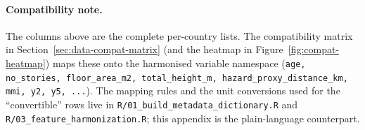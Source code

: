 \documentclass[11pt,a4paper]{article}
\begin{document}
\paragraph{Compatibility note.} The columns above are the complete
per-country lists. The compatibility matrix in
Section~\ref{sec:data-compat-matrix} (and the heatmap in
Figure~\ref{fig:compat-heatmap}) maps these onto the harmonised
variable namespace (\texttt{age, no\_stories, floor\_area\_m2,
total\_height\_m, hazard\_proxy\_distance\_km, mmi, y2, y5, ...}).
The mapping rules and the unit conversions used for the
``convertible'' rows live in
\texttt{R/01\_build\_metadata\_dictionary.R} and
\texttt{R/03\_feature\_harmonization.R}; this appendix is the
plain-language counterpart.
\end{document}
